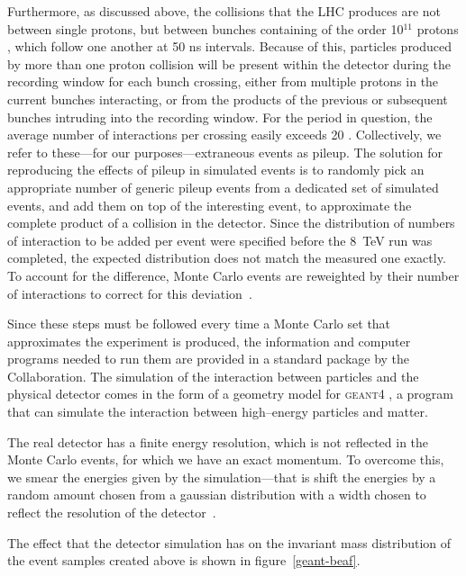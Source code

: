Furthermore, as discussed above, the collisions that the LHC produces are not between single protons, but between bunches containing of the order 10$^{11}$ protons \cite{cernbro}, which follow one another at 50 ns intervals. Because of this, particles produced by more than one proton collision will be present within the \atlas{} detector during the recording window for each bunch crossing, either from multiple protons in the current bunches interacting, or from the products of the previous or subsequent bunches intruding into the recording window. For the period in question, the average number of interactions per crossing easily exceeds 20 \cite{publiclumi}. Collectively, we refer to these---for our purposes---extraneous events as pileup. The solution for reproducing the effects of pileup in simulated events is to randomly pick an appropriate number of generic pileup events from a dedicated set of simulated events, and add them on top of the interesting event, to approximate the complete product of a collision in the detector. Since the distribution of numbers of interaction to be added per event were specified before the 8~TeV run was completed, the expected distribution does not match the measured one exactly. To account for the difference, Monte Carlo events are reweighted by their number of interactions to correct for this deviation~\cite{pileuprew}.

Since these steps must be followed every time a Monte Carlo set that approximates the \atlas{} experiment is produced, the information and computer programs needed to run them are provided in a standard package by the \atlas{} Collaboration. The simulation of the interaction between particles and the physical detector comes in the form of a geometry model for \textsc{geant4} \cite{geant4}, a program that can simulate the interaction between high--energy particles and matter.

The real detector has a finite energy resolution, which is not reflected in the Monte Carlo events, for which we have an exact momentum. To overcome this, we smear the energies given by the simulation---that is shift the energies by a random amount chosen from a gaussian distribution with a width chosen to reflect the resolution of the detector~\cite{ecalib}.

The effect that the detector simulation has on the invariant mass distribution of the event samples created above is shown in figure~\ref{geant-beaf}.

